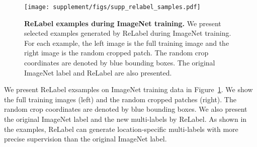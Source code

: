 \documentclass[final]{cvpr}
\newcommand\ours{{{\mbox{ReLabel}}}\xspace}
\begin{document}
\begin{figure}
    \centering
    \texttt{[image: supplement/figs/supp\_relabel\_samples.pdf]}
    \caption{\textbf{\ours examples during ImageNet training.}
    We present selected examples generated by \ours during ImageNet training. 
    For each example, the left image is the full training image and the right image is the random cropped patch. The random crop coordinates are denoted by blue bounding boxes. The original ImageNet label and \ours are also presented. 
    }
    \label{fig:supp_relabel_samples}
\end{figure}

We present \ours exsamples on ImageNet training data in Figure~\ref{fig:supp_relabel_samples}.
We show the full training images (left) and the random cropped patches (right). 
The random crop coordinates are denoted by blue bounding boxes. 
We also present the original ImageNet label and the new multi-labels by \ours. 
As shown in the examples, \ours can generate location-specific multi-labels with more precise supervision than the original ImageNet label. 
\end{document}
